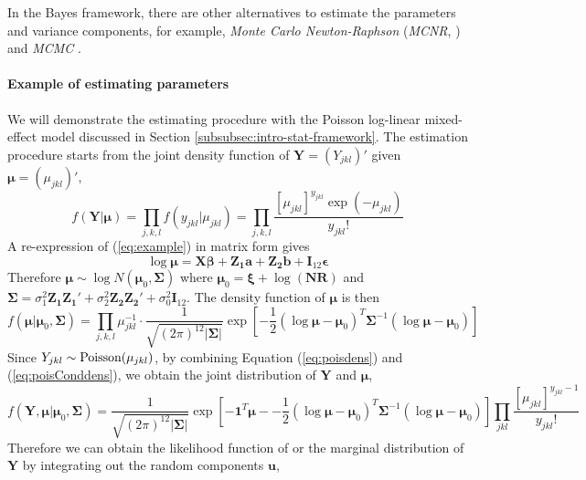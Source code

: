 		In the Bayes framework, there are other alternatives to estimate the parameters and variance components, for example,  \textit{Monte Carlo Newton-Raphson} (\textit{MCNR}, \citealt{mcculloch1997maximum}) and \textit{MCMC} \citep{hadfield2010mcmc}.

	\paragraph{Example of estimating parameters}
	We will demonstrate the estimating procedure with the Poisson log-linear mixed-effect model discussed in Section \ref{subsubsec:intro-stat-framework}.
	The estimation procedure starts from the joint density function of $\bm Y=(Y_{jkl})'$ given $\bm \mu= (\mu_{jkl})'$,
	\begin{equation}\label{eq:poisdens}
	f(\bm Y|\bm \mu )=\prod_{ j, k,l}f(y_{jkl}|\mu_{jkl})=\prod_{j,k,l}\frac{[\mu_{jkl}]^{y_{jkl}}\exp(-\mu_{jkl})}{y_{jkl}!}
	\end{equation}
	A re-expression of  (\ref{eq:example}) in matrix form gives 
	\[\log\bm \mu= \bm {X\beta} + \bm {Z_1 a} + \bm{Z_2b} + \bm I_{12}\bm \epsilon \]
	Therefore  $\bm\mu  \sim \log N(\bm \mu_0, \bm \Sigma)$ where $\bm \mu_0 =\bm\xi + \log(\bm {NR})$ and $\bm \Sigma = \sigma_1^2\bm {Z_1Z_1'} + \sigma_2^2\bm {Z_2 Z_2'} +\sigma_0^2 \bm I_{12}$.
	The density function of $\bm \mu$ is then
	\begin{equation}\label{eq:poisConddens}
	f(\bm \mu |\bm \mu_0, \bm \Sigma)=\prod_{j,k,l} \mu_{jkl}^{-1}\cdot \frac{1}{ \sqrt{(2\pi)^{12}|\bm\Sigma|}}\exp[-\frac{1}{2} {(\log\bm \mu - \bm \mu_0)^T\bm \Sigma^{-1}(\log\bm \mu - \bm \mu_0)}]
	\end{equation}
	Since $Y_{jkl}\sim \text{Poisson} (\mu_{jkl})$, by combining Equation (\ref{eq:poisdens}) and (\ref{eq:poisConddens}), we obtain the joint distribution of $\bm Y$ and $\bm \mu$,
	\[f(\bm Y, \bm \mu |\bm \mu_0, \bm \Sigma) =\frac{1}{\sqrt{(2\pi)^{12}|\bm \Sigma|}}\exp[-\bm 1^T\bm \mu - -\frac{1}{2} {(\log\bm \mu - \bm \mu_0)^T\bm \Sigma^{-1}(\log\bm \mu - \bm \mu_0)}]\prod_{jkl}\frac{[\mu_{jkl}]^{y_{jkl}-1}}{y_{jkl}!}\]
	Therefore we can obtain the likelihood function of or the marginal distribution of $\bm Y$ by integrating out the random components $\bm u$,
